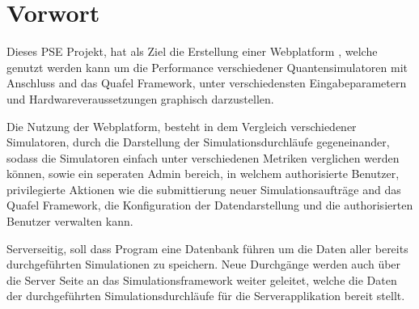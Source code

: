 \section{Vorwort}

Dieses PSE Projekt, hat als Ziel die Erstellung einer Webplatform \name, 
welche genutzt werden kann um die Performance verschiedener Quantensimulatoren 
mit Anschluss and das Quafel Framework, unter verschiedensten Eingabeparametern und 
Hardwareveraussetzungen graphisch darzustellen.

Die Nutzung der Webplatform, besteht in dem Vergleich verschiedener Simulatoren, 
durch die Darstellung der Simulationsdurchläufe gegeneinander, sodass die 
Simulatoren einfach unter verschiedenen Metriken verglichen werden können,
sowie ein seperaten Admin bereich, in welchem authorisierte Benutzer, 
privilegierte Aktionen wie die submittierung neuer Simulationsaufträge and das Quafel Framework,
die Konfiguration der Datendarstellung und die authorisierten Benutzer verwalten kann.

Serverseitig, soll dass Program eine Datenbank führen um die Daten aller bereits durchgeführten 
Simulationen zu speichern. Neue Durchgänge werden auch über die Server Seite an das 
Simulationsframework weiter geleitet, welche die Daten der durchgeführten Simulationsdurchläufe 
für die Serverapplikation bereit stellt.

